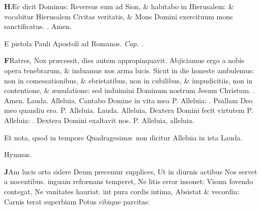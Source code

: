 \documentclass[letter,11pt]{book}
\makeatletter
\DeclareRobustCommand{\Vbar}{\vers@resp{-0.1em}{V}}
\DeclareRobustCommand{\Rbar}{\vers@resp{0pt}{R}}
\newcommand{\vers@resp@sym}{\raisebox{0.2ex}{\rotatebox[origin=c]{-20}{$\m@th\rceil$}}}
\newcommand{\vers@resp}[2]{%
  {\ooalign{\hidewidth\kern#1\vers@resp@sym\hidewidth\cr#2\cr}}%
}%
\def\P{\color{Red} P. \color{black}}
\def\V{\color{Red} \Vbar . \color{black}}
\def\R{\color{Red} \Rbar . \color{black}}
\makeatother
\begin{document}
\begin{multicols*}{2}
\lettrine[lines=2]{\bfseries \color{Red} H}{}\AE c dicit Dominus: Reversus sum ad Sion, \& habitabo in Hierusalem: \& vocabitur Hierusalem Civitas veritatis, \& Mons Domini exercituum mons sanctificatus. \R Amen.
\vspace{-.75em} \begin{center} \color{Red} E\color{black} pistola Pauli Apostoli ad Romanos. \itshape Cap. . \end{center} \vspace{-.75em}
\lettrine[lines=2]{\bfseries \color{Red} F}{}Ratres, Nox pr\ae cessit, dies autem appropinquavit. Abjiciamus ergo a nobis opera tenebrarum, \& induamus nos arma lucis. Sicut in die honeste ambulemus: non in comessationibus, \& ebrietatibus, non in cubilibus, \& impudicitiis, non in contentione, \& \ae mulatione: sed induimini Dominum nostrum Jesum Christum. \R Amen.
\newline \color{Red} Lauda. \color{black} Alleluia. Cantabo Domine in vita mea \P Alleluia: \V Psallam Deo meo quandiu ero. \P Alleluia.
\newline \color{Red} Lauda. \color{black} Alleluia, Dextera Domini fecit virtutem \P Alleluia: \V Dextera Domini exaltavit nos. \P Alleluia, alleluia.
\par \color{Red} Et nota, quod in tempore Quadragesim\ae \ non dicitur \color{black} Alleluia \color{Red} in ista Lauda. \color{black}
\vspace{-.5em} \begin{center} \color{Red} Hymnus. \end{center} \vspace{-.5em}
\lettrine[lines=2]{\bfseries \color{Red} J}{}Am lucis orto sidere
\newline Deum precemur supplices,
\newline \indent Ut in diurnis actibus
\newline \indent Nos servet a nocentibus.
inguam refr\ae nans temperet,
\newline \indent Ne litis error insonet:
\newline \indent Visum fovendo contegat,
\newline \indent Ne vanitates hauriat.
int pura cordis intima,
\newline \indent Absistat \& vecordia:
\newline \indent Carnis terat superbiam
\newline \indent Potus cibique parcitas:

\end{multicols*}
\end{document}

